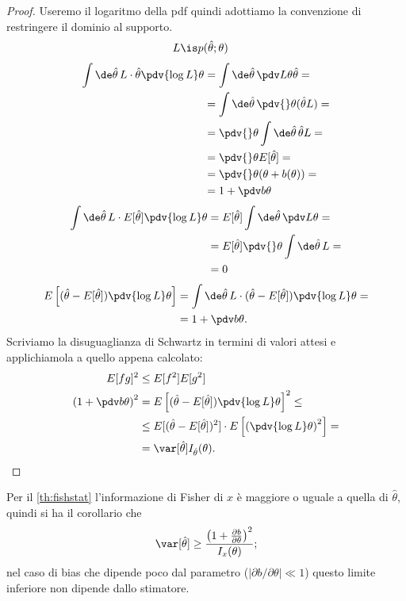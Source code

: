 \begin{proof}
	Useremo il logaritmo della pdf quindi adottiamo la convenzione di restringere il dominio al supporto.
	\begin{align*}
		L &\is p(\hat\theta;\theta)
	\end{align*}
	\begin{align*}
		\int \de\hat\theta\,
		L \cdot \hat\theta \pdv{\log L}\theta 
		&= \int \de\hat\theta\,
		\pdv L\theta \hat\theta = \\
		&= \int \de\hat\theta\,
		\pdv{}\theta (\hat\theta L) = \\
		&= \pdv{}\theta \int \de\hat\theta\, \hat\theta L = \\
		&= \pdv{}\theta E[\hat\theta] = \\
		&= \pdv{}\theta (\theta + b(\theta)) = \\
		&= 1 + \pdv b\theta
	\end{align*}
	\begin{align*}
		\int \de\hat\theta\,
		L \cdot E[\hat\theta] \pdv{\log L}\theta
		&= E[\hat\theta] \int \de\hat\theta\, \pdv L\theta = \\
		&= E[\hat\theta] \pdv{}\theta \int \de\hat\theta\, L = \\
		&= 0
	\end{align*}
	\begin{align*}
		E \left[ (\hat\theta - E[\hat\theta]) \pdv{\log L}\theta \right]
		&= \int \de\hat\theta\, L \cdot
		(\hat\theta - E[\hat\theta]) \pdv{\log L}\theta = \\
		&= 1 + \pdv b\theta.
	\end{align*}
	Scriviamo la disuguaglianza di Schwartz in termini di valori attesi
	e applichiamola a quello appena calcolato:
	\begin{align*}
		E[fg]^2 &\le E[f^2]E[g^2] \\
		\left( 1 + \pdv b\theta \right)^2
		&= E \left[ (\hat\theta - E[\hat\theta]) \pdv{\log L}\theta \right]^2 \le \\
		&\le E[(\hat\theta - E[\hat\theta])^2]
		\cdot E \left[ \left( \pdv{\log L}\theta \right)^2 \right] = \\
		&= \var[\hat\theta] I_{\hat\theta}(\theta). \qedhere
	\end{align*}
\end{proof}

Per il \autoref{th:fishstat} l'informazione di Fisher di $x$ è maggiore o uguale a quella di $\hat\theta$,
quindi si ha il corollario che
\begin{equation*}
	\var[\hat\theta] \ge \frac{\left( 1 + \frac{\partial b}{\partial\theta} \right)^2}{I_x(\theta)};
\end{equation*}
nel caso di bias che dipende poco dal parametro ($|\partial b/\partial\theta| \ll 1$)
questo limite inferiore non dipende dallo stimatore.

